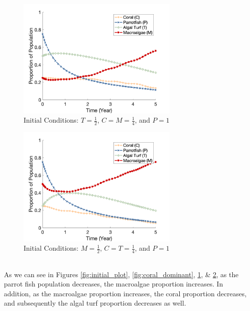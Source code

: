 \documentclass[12pt]{article}
\begin{document}
\begin{figure}[H]
    \centering
    \includegraphics[width=0.7\textwidth]{Latex/Figures/0.25C_0.5T_0.25M.png}
    \caption{Initial Conditions: $T = \frac{1}{2}$, $C = M = \frac{1}{4}$, and $P = 1$}
    \label{fig:turf_dominant}
\end{figure}
\begin{figure}[H]
    \centering
    \includegraphics[width=0.7\textwidth]{Latex/Figures/0.25C_0.25T_0.5M.png}
    \caption{Initial Conditions: $M = \frac{1}{2}$, $C = T = \frac{1}{4}$, and $P = 1$}
    \label{fig:macroalgae_dominant}
\end{figure}\\
As we can see in Figures \ref{fig:initial_plot}, \ref{fig:coral_dominant}, \ref{fig:turf_dominant}, \& \ref{fig:macroalgae_dominant}, as the parrot fish population decreases, the macroalgae proportion increases. In addition, as the macroalgae proportion increases, the coral proportion decreases, and subsequently the algal turf proportion decreases as well.\\
\end{document}
